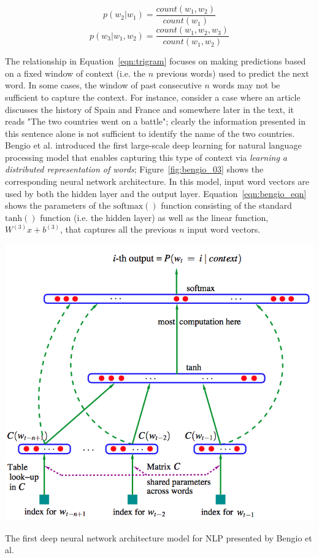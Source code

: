 \documentclass{tufte-handout}
\begin{document}
\begin{equation}
	p(w_2 | w_1) = \dfrac {count(w_1,w_2)}{count(w_1)}
	\label{eqn:bigram}
\end{equation}
\begin{equation}
	p(w_3 | w_1, w_2) = \dfrac {count(w_1,w_2,w_3)}{count(w_1, w_2)}
	\label{eqn:trigram}
\end{equation}

The relationship in Equation~\ref{eqn:trigram} focuses on making predictions based on a fixed window of context (i.e. the $n$ previous words) used to predict the next word. In some cases, the window of past consecutive $n$ words may not be sufficient to capture the context. For instance, consider a case where an article discusses the history of Spain and France and somewhere later in the text, it reads "The two countries went on a battle"; clearly the information presented in this sentence alone is not sufficient to identify the name of the two countries. Bengio et al. introduced the first large-scale deep learning for natural language processing model that enables capturing this type of context via \textit{learning a distributed representation of words}; Figure~\ref{fig:bengio_03} shows the corresponding neural network architecture. In this model, input word vectors are used by both the hidden layer and the output layer. 
Equation~\ref{eqn:bengio_eqn} shows the parameters of the $\operatorname{softmax()}$ function consisting of the standard $\operatorname{tanh()}$ function (i.e. the hidden layer) as well as the linear function, $W^{(3)}x+b^{(3)}$, that captures all the previous $n$ input word vectors.

\begin{marginfigure}
	\centering
	\includegraphics[width=\linewidth]{bengio_03.png}
	\caption {The first deep neural network architecture model for NLP presented by Bengio et al.}
	\label{fig:bengio_03}
\end{marginfigure}
\end{document}
